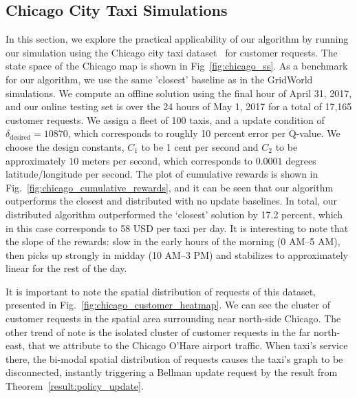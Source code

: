 \documentclass[journal]{IEEEtran}
\begin{document}
\subsection{Chicago City Taxi Simulations}
In this section, we explore the practical applicability of our algorithm by running our simulation using the Chicago city taxi dataset~\cite{chicagoData} for customer requests. The state space of the Chicago map is shown in Fig~\ref{fig:chicago_ss}. As a benchmark for our algorithm, we use the same 'closest' baseline as in the GridWorld simulations. We compute an offline solution using the final hour of April 31, 2017, and our online testing set is over the 24 hours of May 1, 2017 for a total of 17,165 customer requests. We assign a fleet of 100 taxis, and a update condition of $\delta_\mathrm{desired} = 10870$, which corresponds to roughly 10 percent error per Q-value. We choose the design constants, $C_1$ to be 1 cent per second and $C_2$ to be approximately $10$ meters per second, which corresponds to $0.0001$ degrees latitude/longitude per second. The plot of cumulative rewards is shown in Fig.~\ref{fig:chicago_cumulative_rewards}, and it can be seen that our algorithm outperforms the closest and distributed with no update baselines. In total, our distributed algorithm outperformed the `closest' solution by 17.2 percent, which in this case corresponds to 58 USD per taxi per day. It is interesting to note that the slope of the rewards: slow in the early hours of the morning (0 AM--5 AM), then picks up strongly in midday (10 AM--3 PM) and stabilizes to approximately linear for the rest of the day. 

It is important to note the spatial distribution of requests of this dataset, presented in Fig.~\ref{fig:chicago_customer_heatmap}. We can see the cluster of customer requests in the spatial area surrounding near north-side Chicago. The other trend of note is the isolated cluster of customer requests in the far north-east, that we attribute to the Chicago O'Hare airport traffic. When taxi's service there, the bi-modal spatial distribution of requests causes the taxi's graph to be disconnected, instantly triggering a Bellman update request by the result from Theorem~\ref{result:policy_update}.
\end{document}
